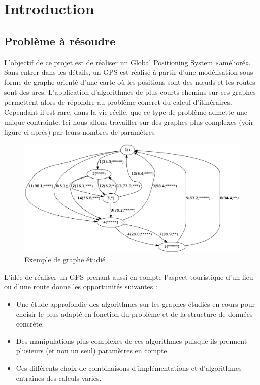 \chapter{Introduction}

\renewcommand{\labelitemi}{$\bullet$}
\section{Problème à résoudre}
L'objectif de ce projet est de réaliser un Global Positioning System «amélioré». Sans entrer dans les détails, un GPS est réalisé à partir d'une modélisation sous forme de graphe orienté d'une carte où les positions sont des nœuds et les routes sont des arcs. L'application d'algorithmes de plus courts chemins sur ces graphes permettent alors de répondre au problème concret du calcul d'itinéraires. Cependant il est rare, dans la vie réelle, que ce type de problème admette une unique contrainte. Ici nous allons travailler sur des graphes plus complexes (voir figure ci-après) par leurs nombres de paramètres
\newline
\newline
\newline
\begin{figure}[!h] 
\begin{center}
  \includegraphics[scale=0.40]{g.png}
\end{center}
\caption{Exemple de graphe étudié}
\end{figure} 


\clearpage


L'idée de réaliser un GPS prenant aussi en compte l'aspect touristique d'un lieu ou d'une route donne les opportunités suivantes : 
\begin{itemize}
\item
Une étude approfondie des algorithmes sur les graphes étudiés en cours pour choisir le plus adapté en fonction du problème et de la structure de données concrète.
\item
Des manipulations plus complexes de ces algorithmes puisque ils prennent plusieurs (et non un seul) paramètres en compte.
\item
Ces différents choix de combinaisons d'implémentations et d'algorithmes entraînes des calculs variés.
\end{itemize}

